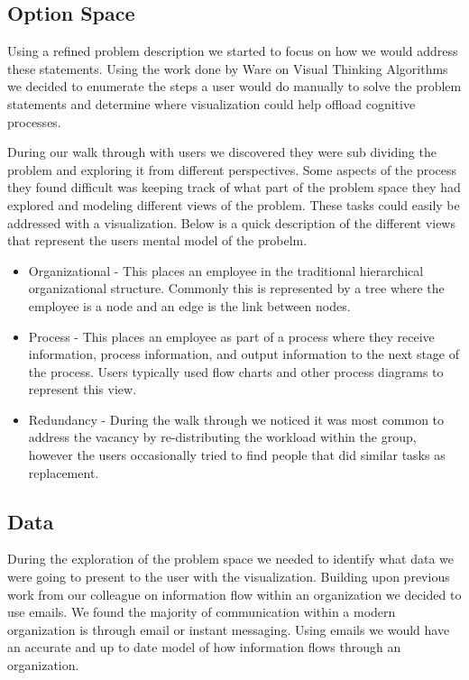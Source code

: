 \documentclass[journal]{vgtc}                %
\begin{document}
\subsection{Option Space}
Using a refined problem description we started to focus on how we would address these statements.  Using the work done by Ware on Visual Thinking Algorithms\cite[Chapter 11]{ware2012information} we decided to enumerate the steps a user would do manually to solve the problem statements and determine where visualization could help offload cognitive processes.

During our walk through with users we discovered they were sub dividing the problem and exploring it from different perspectives.  Some aspects of the process they found difficult was keeping track of what part of the problem space they had explored and modeling different views of the problem.  These tasks could easily be addressed with a visualization.  Below is a quick description of the different views that represent the users mental model of the probelm.
\begin{itemize}
\item Organizational - This places an employee in the traditional hierarchical organizational structure.  Commonly this is represented by a tree where the employee is a node and an edge is the link between nodes.
\item Process - This places an employee as part of a process where they receive information, process information, and output information to the next stage of the process.  Users typically used flow charts and other process diagrams to represent this view.
\item Redundancy - During the walk through we noticed it was most common to address the vacancy by re-distributing the workload within the group, however the users occasionally tried to find people that did similar tasks as replacement.
\end{itemize}

\subsection{Data}
During the exploration of the problem space we needed to identify what data we were going to present to the user with the visualization.  Building upon previous work from our colleague on information flow within an organization we decided to use emails.  We found the majority of communication within a modern organization is through email or instant messaging.  Using emails we would have an accurate and up to date model of how information flows through an organization.  
\end{document}
